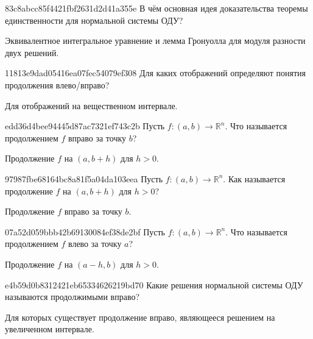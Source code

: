 \begin{note}{83c8abcc85f4421fbf2631d2d41a355e}
    В чём основная идея доказательства теоремы единственности для нормальной системы ОДУ?

    \begin{cloze}{1}
        Эквивалентное интегральное уравнение и лемма Гронуолла для модуля разности двух решений.
    \end{cloze}
\end{note}

\begin{note}{11813e9dad05416ea07fec54079ef308}
    Для каких отображений определяют понятия продолжения влево/вправо?

    \begin{cloze}{1}
        Для отображений на вещественном интервале.
    \end{cloze}
\end{note}

\begin{note}{edd36d4bee94445d87ac7321ef743c2b}
    Пусть \({ f : (a, b) \to \mathbb R^{n} }\).
    Что называется продолжением \({ f }\) вправо за точку \({ b }\)?

    \begin{cloze}{1}
        Продолжение \({ f }\) на \({ (a, b + h) }\) для \({ h > 0 }\).
    \end{cloze}
\end{note}

\begin{note}{97987fbe68164bc8a81f5a04da103eea}
    Пусть \({ f : (a, b) \to \mathbb R^{n} }\).
    Как называется продолжение \({ f }\) на \({ (a, b + h) }\) для \({ h > 0 }\)?

    \begin{cloze}{1}
        Продолжение \({ f }\) вправо за точку \({ b }\).
    \end{cloze}
\end{note}

\begin{note}{07a52d059bbb42b69130084ef38de2bf}
    Пусть \({ f : (a, b) \to \mathbb R^{n} }\).
    Что называется продолжением \({ f }\) влево за точку \({ a }\)?

    \begin{cloze}{1}
        Продолжение \({ f }\) на \({ (a - h, b) }\) для \({ h > 0 }\).
    \end{cloze}
\end{note}

\begin{note}{e4b59d0b8312421eb65334626219bd70}
    Какие решения нормальной системы ОДУ называются продолжимыми вправо?

    \begin{cloze}{1}
        Для которых существует продолжение вправо, являющееся решением на увеличенном интервале.
    \end{cloze}
\end{note}

